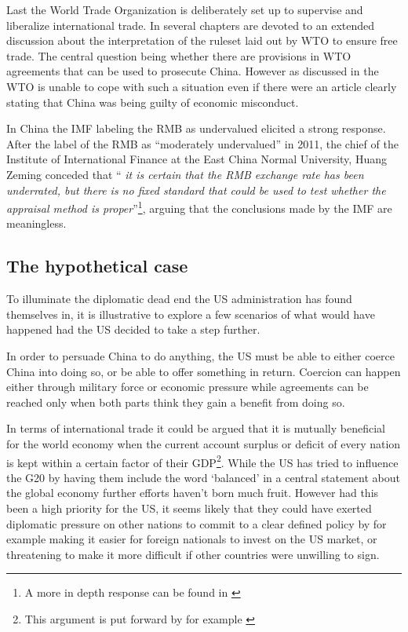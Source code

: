 Last the World Trade Organization is deliberately set up to supervise 
and liberalize international trade. In \cite{Evenett10} several chapters 
are devoted to an extended discussion about the interpretation of the 
ruleset laid out by WTO to ensure free trade. The central question being 
whether there are provisions in WTO agreements that can be used to 
prosecute China.  However as discussed in \cite{Levy11} the WTO is 
unable to cope with such a situation even if there were an article 
clearly stating that China was being guilty of economic misconduct.

In China the IMF labeling the RMB as undervalued elicited a strong 
response. After the label of the RMB as ``moderately undervalued'' in 
2011, the chief of the Institute of International Finance at the East 
China Normal University, Huang Zeming conceded that ``\textit{ it is 
	certain that the RMB exchange rate has been underrated, but there is 
	no fixed standard that could be used to test whether the appraisal 
method is proper}''\footnote{A more in depth response can be found in 
\cite{ChinaDaily11}}, arguing that the conclusions made by the IMF are 
meaningless.

\subsection{The hypothetical case}

To illuminate the diplomatic dead end the US administration has found 
themselves in, it is illustrative to explore a few scenarios of what 
would have happened had the US decided to take a step further.

In order to persuade China to do anything, the US must be able to either 
coerce China into doing so, or be able to offer something in return.  
Coercion can happen either through military force or economic pressure 
while agreements can be reached only when both parts think they gain a 
benefit from doing so.

In terms of international trade it could be argued that it is mutually 
beneficial for the world economy when the current account surplus or 
deficit of every nation is kept within a certain factor of their 
GDP\footnote{This argument is put forward by for example 
\cite{cline2009}}. While the US has tried to influence the G20 by having 
them include the word `balanced' in a central statement about the global 
economy further efforts haven't born much fruit. However had this been a 
high priority for the US, it seems likely that they could have exerted 
diplomatic pressure on other nations to commit to a clear defined policy 
by for example making it easier for foreign nationals to invest on the 
US market, or threatening to make it more difficult if other countries 
were unwilling to sign.

